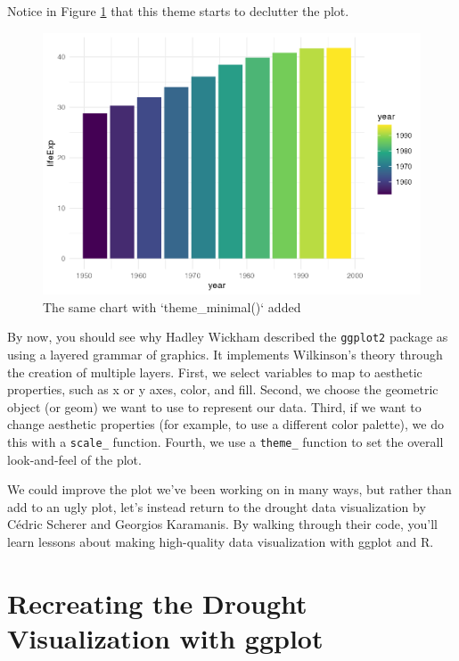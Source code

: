 \documentclass[
]{book}
\begin{document}
Notice in Figure \ref{fig:gapminder-theme-plot} that this theme starts to declutter the plot.

\begin{figure}
\includegraphics[width=1\linewidth]{data-viz_files/figure-latex/gapminder-theme-plot-1} \caption{The same chart with `theme_minimal()` added}\label{fig:gapminder-theme-plot}
\end{figure}

By now, you should see why Hadley Wickham described the \texttt{ggplot2} package as using a layered grammar of graphics. It implements Wilkinson's theory through the creation of multiple layers. First, we select variables to map to aesthetic properties, such as x or y axes, color, and fill. Second, we choose the geometric object (or geom) we want to use to represent our data. Third, if we want to change aesthetic properties (for example, to use a different color palette), we do this with a \texttt{scale\_} function. Fourth, we use a \texttt{theme\_} function to set the overall look-and-feel of the plot.

We could improve the plot we've been working on in many ways, but rather than add to an ugly plot, let's instead return to the drought data visualization by Cédric Scherer and Georgios Karamanis. By walking through their code, you'll learn lessons about making high-quality data visualization with ggplot and R.

\hypertarget{recreating-the-drought-visualization-with-ggplot}{%
\section*{Recreating the Drought Visualization with ggplot}\label{recreating-the-drought-visualization-with-ggplot}}
\end{document}
